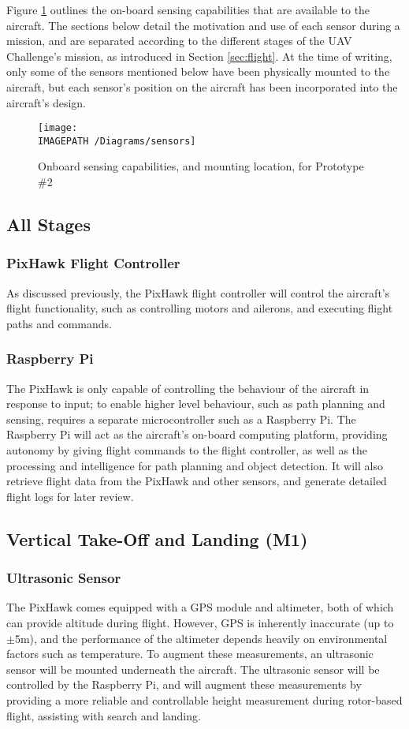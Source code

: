 \label{sec:sensing}
Figure \ref{fig:sensing} outlines the on-board sensing capabilities that are available to the aircraft. The sections below detail the motivation and use of each sensor during a mission, and are separated according to the different stages of the UAV Challenge's mission, as introduced in Section \ref{sec:flight}. At the time of writing, only some of the sensors mentioned below have been physically mounted to the aircraft, but each sensor's position on the aircraft has been incorporated into the aircraft's design.

\begin{figure}[!ht]
	\centering
	\texttt{[image: \\IMAGEPATH /Diagrams/sensors]}
	\caption{Onboard sensing capabilities, and mounting location, for Prototype \#2}
	\label{fig:sensing}
\end{figure}

\subsection{All Stages}

\subsubsection*{PixHawk Flight Controller}
As discussed previously, the PixHawk flight controller will control the aircraft's flight functionality, such as controlling motors and ailerons, and executing flight paths and commands.

\subsubsection*{Raspberry Pi}
The PixHawk is only capable of controlling the behaviour of the aircraft in response to input; to enable higher level behaviour, such as path planning and sensing, requires a separate microcontroller such as a Raspberry Pi. The Raspberry Pi will act as the aircraft's on-board computing platform, providing autonomy by giving flight commands to the flight controller, as well as the processing and intelligence for path planning and object detection. It will also retrieve flight data from the PixHawk and other sensors, and generate detailed flight logs for later review.

\subsection{Vertical Take-Off and Landing (M1)}
\subsubsection*{Ultrasonic Sensor}
The PixHawk comes equipped with a GPS module and altimeter, both of which can provide altitude during flight. However, GPS is inherently inaccurate (up to $\pm$5m), and the performance of the altimeter depends heavily on environmental factors such as temperature. To augment these measurements, an ultrasonic sensor will be mounted underneath the aircraft. The ultrasonic sensor will be controlled by the Raspberry Pi, and will augment these measurements by providing a more reliable and controllable height measurement during rotor-based flight, assisting with search and landing.

